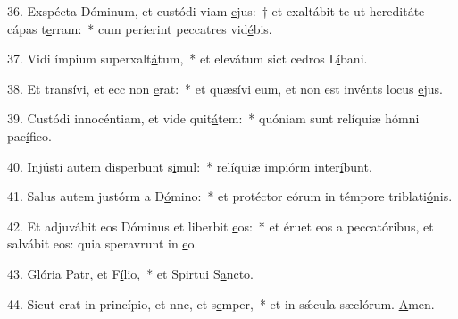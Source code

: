 36. Exspécta Dóminum, et custódi viam \uline{e}jus:~† et exaltábit te ut hereditáte cápas t\uline{e}rram:~* cum períerint peccatres vid\uline{é}bis.\par 
37. Vidi ímpium superxalt\uline{á}tum,~* et elevátum sict cedros L\uline{í}bani.\par 
38. Et transívi, et ecc non \uline{e}rat:~* et quæsívi eum, et non est invénts locus \uline{e}jus.\par 
39. Custódi innocéntiam, et vide quit\uline{á}tem:~* quóniam sunt relíquiæ hómni pac\uline{í}fico.\par 
40. Injústi autem disperbunt s\uline{i}mul:~* relíquiæ impiórm inter\uline{í}bunt.\par 
41. Salus autem justórm a D\uline{ó}mino:~* et protéctor eórum in témpore triblati\uline{ó}nis.\par 
42. Et adjuvábit eos Dóminus et liberbit \uline{e}os:~* et éruet eos a peccatóribus, et salvábit eos: quia speravrunt in \uline{e}o.\par 
43. Glória Patr, et F\uline{í}lio,~* et Spirtui S\uline{a}ncto.\par 
44. Sicut erat in princípio, et nnc, et s\uline{e}mper,~* et in sǽcula sæclórum. \uline{A}men.\par 
